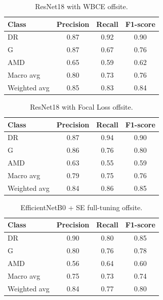 \documentclass{article}
\begin{document}
\begin{table}[H]
\centering
\begin{tabular}{lccc}
\toprule
\textbf{Class} & \textbf{Precision} & \textbf{Recall} & \textbf{F1-score} \\
\midrule
DR  & 0.87 & 0.92 & 0.90 \\
G   & 0.87 & 0.67 & 0.76 \\
AMD & 0.65 & 0.59 & 0.62 \\
\midrule
Macro avg    & 0.80 & 0.73 & 0.76 \\
Weighted avg & 0.85 & 0.83 & 0.84 \\
\bottomrule
\end{tabular}
\caption{ResNet18 with WBCE offsite.}
\label{tab:resnet_cb_task3}
\end{table}


\begin{table}[H]
\centering
\begin{tabular}{lccc}
\toprule
\textbf{Class} & \textbf{Precision} & \textbf{Recall} & \textbf{F1-score} \\
\midrule
DR  & 0.87 & 0.94 & 0.90 \\
G   & 0.86 & 0.76 & 0.80 \\
AMD & 0.63 & 0.55 & 0.59 \\
\midrule
Macro avg    & 0.79 & 0.75 & 0.76 \\
Weighted avg & 0.84 & 0.86 & 0.85 \\
\bottomrule
\end{tabular}
\caption{ResNet18 with Focal Loss offsite.}
\label{tab:resnet_focal_task3}
\end{table}

\begin{table}[t]
\centering
\begin{tabular}{lccc}
\toprule
\textbf{Class} & \textbf{Precision} & \textbf{Recall} & \textbf{F1-score} \\
\midrule
DR  & 0.90 & 0.80 & 0.85 \\
G   & 0.80 & 0.76 & 0.78 \\
AMD & 0.56 & 0.64 & 0.60 \\
\midrule
Macro avg    & 0.75 & 0.73 & 0.74 \\
Weighted avg & 0.84 & 0.77 & 0.80 \\
\bottomrule
\end{tabular}
\caption{EfficientNetB0 + SE full-tuning offsite.}
\label{tab:efficient_full_se_task3}
\end{table}
\end{document}
